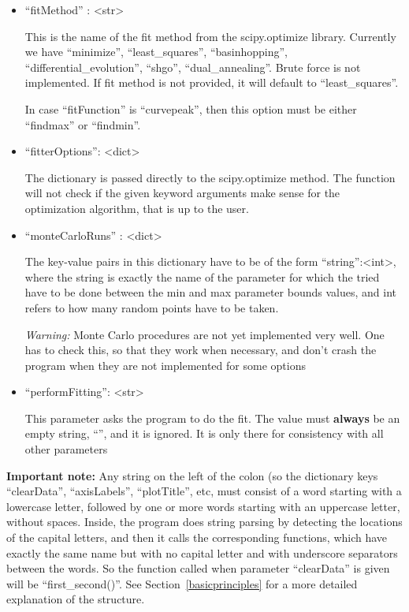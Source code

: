 \documentclass[11pt]{article} %
\begin{document}
\begin{tcolorbox}[breakable,title=Sending ``params'' to the server]
\begin{itemize}
\item ``fitMethod'' : <str> 

This is the name of the fit method from the scipy.optimize library. Currently we have ``minimize'', ``least\_squares'', ``basinhopping'', ``differential\_evolution'', ``shgo'', ``dual\_annealing''. Brute force is not implemented. If fit method is not provided, it will default to ``least\_squares''.

In case ``fitFunction'' is ``curvepeak'', then this option must be either ``findmax'' or ``findmin''. 

\item ``fitterOptions'': <dict> 

The dictionary is passed directly to the scipy.optimize method. The function will not check if the given keyword arguments make sense for the optimization algorithm, that is up to the user.

\item ``monteCarloRuns'' : <dict> 

The key-value pairs in this dictionary have to be of the form ``string'':<int>, where the string is exactly the name of the parameter for which the tried have to be done between the min and max parameter bounds values, and int refers to how many random points have to be taken. 

\textit{Warning:} Monte Carlo procedures are not yet implemented very well. One has to check this, so that they work when necessary, and don't crash the program when they are not implemented for some options


\item ``performFitting'': <str> 

This parameter asks the program to do the fit. The value must \textbf{always} be an empty string, ``'', and it is ignored. It is only there for consistency with all other parameters

\end{itemize}


\textbf{Important note:} Any string on the left of the colon (so the dictionary keys ``clearData'', ``axisLabels'', ``plotTitle'', etc, must consist of a word starting with a lowercase letter, followed by one or more words starting with an uppercase letter, without spaces. Inside, the program does string parsing by detecting the locations of the capital letters, and then it calls the corresponding functions, which have exactly the same name but with no capital letter and with underscore separators between the words. So the function called when parameter ``clearData'' is given will be ``first\_second()''. See Section~\ref{basicprinciples} for a more detailed explanation of the structure.  


\end{tcolorbox}
\end{document}
